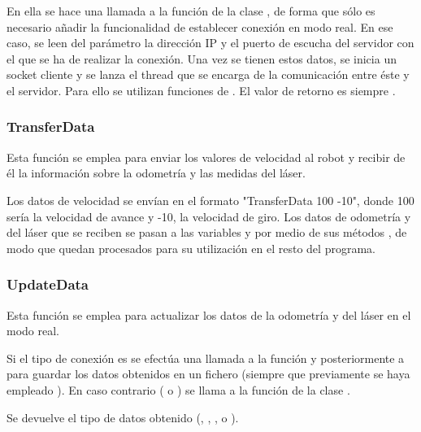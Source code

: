 \noindent
En ella se hace una llamada a la función  de la clase , de forma que sólo es necesario añadir la funcionalidad de establecer conexión en modo real. En ese caso, se leen del parámetro  la dirección IP y el puerto de escucha del servidor con el que se ha de realizar la conexión. Una vez se tienen estos datos, se inicia un socket cliente y se lanza el thread que se encarga de la comunicación entre éste y el servidor. Para ello se utilizan funciones de . El valor de retorno es siempre .

\subsubsection{TransferData}

\noindent
{}

\noindent
Esta función se emplea para enviar los valores de velocidad al robot y recibir de él la información sobre la odometría y las medidas del láser.

\noindent
Los datos de velocidad se envían en el formato "TransferData 100 -10", donde 100 sería la velocidad de avance y -10, la velocidad de giro. Los datos de odometría y del láser que se reciben se pasan a las variables  y  por medio de sus métodos , de modo que quedan procesados para su utilización en el resto del programa.


\subsubsection{UpdateData}

\noindent
{}

\noindent
Esta función se emplea para actualizar los datos de la odometría y del láser en el modo real.

\noindent
Si el tipo de conexión es  se efectúa una llamada a la función  y posteriormente a  para guardar los datos obtenidos en un fichero (siempre que previamente se haya empleado ). En caso contrario ( o ) se llama a la función  de la clase .

\noindent
Se devuelve el tipo de datos obtenido (, , ,  o ).



